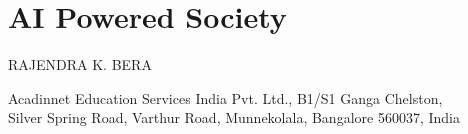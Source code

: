 \chapter{AI Powered Society}

\begin{center}
{\large\uppercase{Rajendra K. Bera}}

\vskip -6pt

Acadinnet Education Services India Pvt. Ltd., B1/S1 Ganga Chelston,\\
Silver Spring Road, Varthur Road, Munnekolala, Bangalore 560037, India
\end{center}
\vskip 4cm

\noindent{}

\newpage

